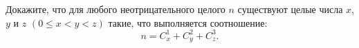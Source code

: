 \documentclass{article}
\begin{document}
Докажите, что для любого неотрицательного целого $n$ существуют целые числа $x$, $y$ и $z$ $(0 \leqslant x < y < z)$ такие, что 
выполняется соотношение: $$n = C_x^1 + C_y^2 + C_z^3.$$
\end{document}
